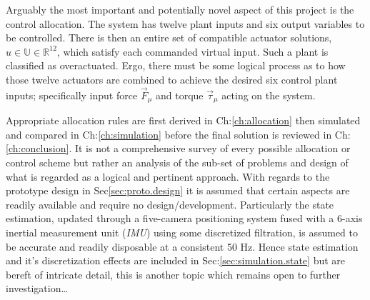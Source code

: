 \par
Arguably the most important and potentially novel aspect of this project is the control allocation. The system has twelve plant inputs and six output variables to be controlled. There is then an entire set of compatible actuator solutions, $u\in\mathbb{U}\in\mathbb{R}^{12}$, which satisfy each commanded virtual input. Such a plant is classified as overactuated. Ergo, there must be some logical process as to how those twelve actuators are combined to achieve the desired six control plant inputs; specifically input force $\vec{F}_{\mu}$ and torque $\vec{\tau}_{\mu}$ acting on the system.
\par
Appropriate allocation rules are first derived in Ch:\ref{ch:allocation} then simulated and compared in Ch:\ref{ch:simulation} before the final solution is reviewed in Ch:\ref{ch:conclusion}. It is not a comprehensive survey of every possible allocation or control scheme but rather an analysis of the sub-set of problems and design of what is regarded as a logical and pertinent approach. With regards to the prototype design in Sec\ref{sec:proto.design} it is assumed that certain aspects are readily available and require no design/development. Particularly the state estimation, updated through a five-camera positioning system fused with a 6-axis inertial measurement unit (\emph{IMU}) using some discretized filtration, is assumed to be accurate and readily disposable at a consistent 50 Hz. Hence state estimation and it's discretization effects are included in Sec:\ref{sec:simulation.state} but are bereft of intricate detail, this is another topic which remains open to further investigation\ldots
